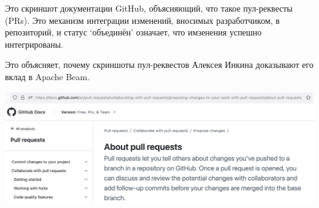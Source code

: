 
Это скриншот документации GitHub, объясняющий, что такое пул-реквесты (PRs).
Это механизм интеграции изменений, вносимых разработчиком, в репозиторий,
и статус `объединён' означает, что имзенения успешно интегрированы.

Это объясняет, почему скриншоты пул-реквестов Алексея Инкина  доказывают его вклад в Apache Beam.

\includegraphics[width=\textwidth]{github-prs}

\pagebreak
